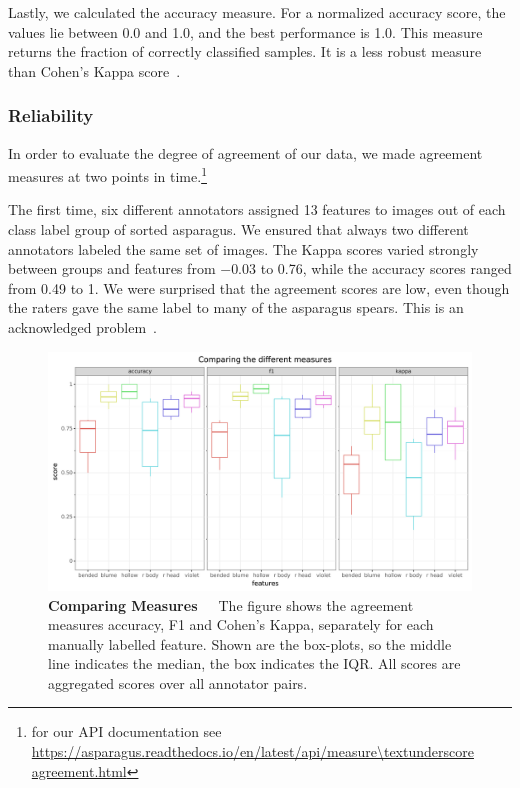 Lastly, we calculated the accuracy measure. For a normalized accuracy score, the values lie between 0.0 and 1.0, and the best performance is 1.0. This measure returns the fraction of correctly classified samples. It is a less robust measure than Cohen’s Kappa score~\citep{mchugh2012interrater}.


\subsubsection{Reliability}
\label{subsec:Reliability}

In order to evaluate the degree of agreement of our data, we made agreement measures at two points in time.\footnote{for our API documentation see \\ \url{https://asparagus.readthedocs.io/en/latest/api/measure\textunderscore agreement.html}}

The first time, six different annotators assigned 13 features to images out of each class label group of sorted asparagus. We ensured that always two different annotators labeled the same set of images. The Kappa scores varied strongly between groups and features from $-0.03$ to 0.76, while the accuracy scores ranged from 0.49 to 1. We were surprised that the agreement scores are low, even though the raters gave the same label to many of the asparagus spears. This is an acknowledged problem~\citep{powers2012problem,sim2005kappa,feinstein1990high,posterFlight}.

\begin{figure}[!ht]
	\centering
	\includegraphics[scale=0.55]{Figures/chapter03/kappa_measurewise.png}
	\decoRule
	\caption[Agreement Measure-Wise Comparison of all Features]{\textbf{Comparing Measures}~~~The figure shows the agreement measures accuracy, F1 and Cohen’s Kappa, separately for each manually labelled feature. Shown are the box-plots, so the middle line indicates the median, the box indicates the IQR. All scores are aggregated scores over all annotator pairs.}
	\label{fig:KappaMeasurewise}
\end{figure}

